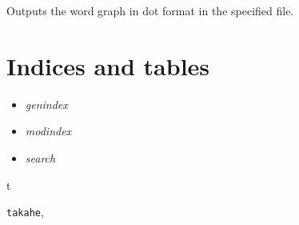 \documentclass[letterpaper,10pt,english]{sphinxmanual}
\begin{document}
\begin{fulllineitems}
\begin{fulllineitems}
\end{fulllineitems}


\begin{fulllineitems}
\label{index:takahe.word_graph.write_dot}
Outputs the word graph in dot format in the specified file.

\end{fulllineitems}


\end{fulllineitems}



\chapter{Indices and tables}
\label{index:indices-and-tables}\begin{itemize}
\item {} 
\emph{genindex}

\item {} 
\emph{modindex}

\item {} 
\emph{search}

\end{itemize}


\renewcommand{\indexname}{Python Module Index}
\begin{theindex}
\def\bigletter#1{{\Large\sffamily#1}\nopagebreak\vspace{1mm}}
\bigletter{t}
\item {\texttt{takahe}}, \pageref{index:module-takahe}
\end{theindex}

\renewcommand{\indexname}{Index}
\printindex
\end{document}
